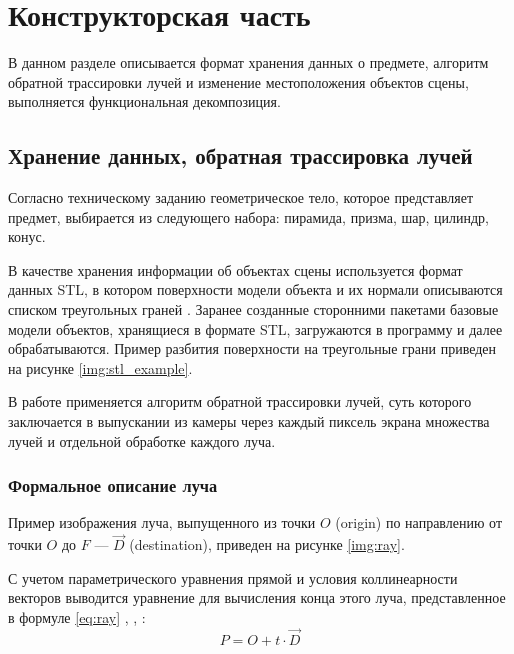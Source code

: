 \chapter{Конструкторская часть}

В данном разделе описывается формат хранения данных о предмете, алгоритм обратной трассировки лучей и изменение местоположения объектов сцены, выполняется функциональная декомпозиция.

\section{Хранение данных, обратная трассировка лучей}

Согласно техническому заданию геометрическое тело, которое представляет предмет, выбирается из следующего набора: пирамида, призма, шар, цилиндр, конус.

В качестве хранения информации об объектах сцены используется формат данных STL, в котором поверхности модели объекта и их нормали описываются списком треугольных граней \cite{szilvsi2003analysis}.
Заранее созданные сторонними пакетами базовые модели объектов, хранящиеся в формате STL, загружаются в программу и далее обрабатываются.
Пример разбития поверхности на треугольные грани приведен на рисунке \ref{img:stl_example}.


В работе применяется алгоритм обратной трассировки лучей, суть которого заключается в выпускании из камеры через каждый пиксель экрана множества лучей и отдельной обработке каждого луча.

\subsection{Формальное описание луча}

Пример изображения луча, выпущенного из точки $O$ (origin) по направлению от точки $O$ до $F$ --- $\overrightarrow{D}$ (destination), приведен на рисунке \ref{img:ray}.

С учетом параметрического уравнения прямой и условия коллинеарности векторов выводится уравнение для вычисления конца этого луча, представленное в формуле \ref{eq:ray} \cite{божко2007компьютерная}, \cite{роджерс}, \cite{боресков}:
\begin{equation}\label{eq:ray}
	P = O + t \cdot \overrightarrow{D}
\end{equation}

